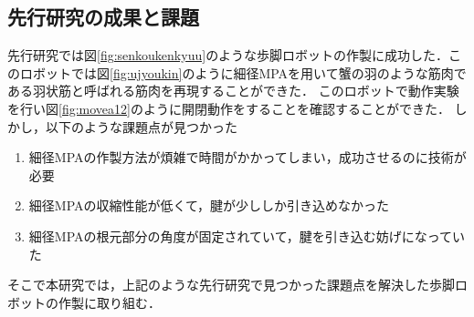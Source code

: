 %
\subsection{先行研究の成果と課題}
先行研究では図\ref{fig:senkoukenkyuu}\cite{hasegawa}のような歩脚ロボットの作製に成功した．このロボットでは図\ref{fig:ujyoukin}\cite{hasegawa}のように細径MPAを用いて蟹の羽のような筋肉である羽状筋と呼ばれる筋肉を再現することができた．
このロボットで動作実験を行い図\ref{fig:movea12}\cite{hasegawa}のように開閉動作をすることを確認することができた．
しかし，以下のような課題点が見つかった
\begin{enumerate}
  \item 細径MPAの作製方法が煩雑で時間がかかってしまい，成功させるのに技術が必要
  \item 細径MPAの収縮性能が低くて，腱が少ししか引き込めなかった
  \item 細径MPAの根元部分の角度が固定されていて，腱を引き込む妨げになっていた
\end{enumerate}
そこで本研究では，上記のような先行研究で見つかった課題点を解決した歩脚ロボットの作製に取り組む．
